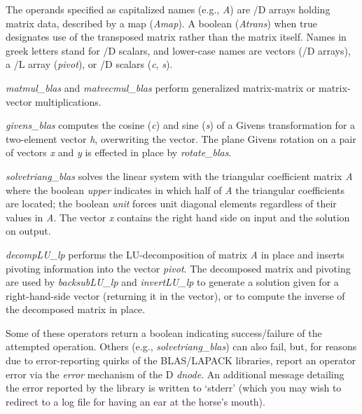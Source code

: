 

The operands specified as capitalized names (e.g., \emph{A}) are /D arrays holding matrix data, described by a map (\emph{Amap}). A boolean (\emph{Atrans}) when true designates use of the transposed matrix rather than the matrix itself. Names in greek letters stand for /D scalars, and lower-case names are vectors (/D arrays), a /L array (\emph{pivot}), or /D scalars (\emph{c}, \emph{s}).

\emph{matmul\_blas} and \emph{matvecmul\_blas} perform generalized matrix-matrix or matrix-vector multiplications.

\emph{givens\_blas} computes the cosine (\emph{c}) and sine (\emph{s}) of a Givens transformation for a two-element vector \emph{h}, overwriting the vector. The plane Givens rotation on a pair of vectors \emph{x} and \emph{y} is effected in place by \emph{rotate\_blas}. 

\emph{solvetriang\_blas} solves the linear system with the triangular coefficient matrix \emph{A} where the boolean \emph{upper} indicates in which half of \emph{A} the triangular coefficients are located; the boolean \emph{unit} forces unit diagonal elements regardless of their values in \emph{A}. The vector \emph{x} contains the right hand side on input and the solution on output.

\emph{decompLU\_lp}  performs the LU-decomposition of matrix \emph{A} in place and inserts pivoting information into the vector \emph{pivot}. The decomposed matrix and pivoting are used by \emph{backsubLU\_lp} and \emph{invertLU\_lp} to generate a solution given for a right-hand-side vector (returning it in the vector), or to compute the inverse of the decomposed matrix in place.
 
 
Some of these operators return a boolean indicating success/failure of the attempted operation. Others (e.g., \emph{solvetriang\_blas}) can also fail, but, for reasons due to error-reporting quirks of the BLAS/LAPACK libraries, report an operator error via the \emph{error} mechanism of the D \emph{dnode}. An additional message detailing the error reported by the library is written to `stderr' (which you may wish to redirect to a log file for having an ear at the horse's mouth).

